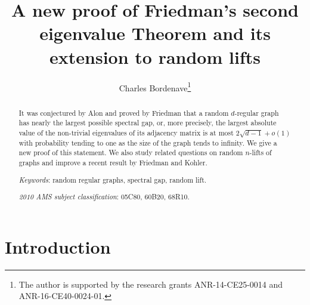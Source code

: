 \documentclass[11pt]{article}
\title{A new proof of Friedman's second eigenvalue Theorem and its extension to random lifts}
\author{Charles Bordenave\footnote{The author is supported by the research grants ANR-14-CE25-0014 and ANR-16-CE40-0024-01.}}
\newcommand{\1}{1\!\!{\sf I}}\newcommand{\IND}{\1}
\begin{document}
\maketitle



\begin{abstract}
It was conjectured by Alon and proved by Friedman that a random $d$-regular graph has nearly the largest possible spectral gap, or, more precisely, the largest absolute value of the non-trivial eigenvalues of its adjacency matrix is at most $2\sqrt{d-1} +o(1)$ with probability tending to one as the size of the graph tends to infinity. We give a new  proof of this statement.  We also study related questions on random $n$-lifts of graphs  and improve a recent result by Friedman and Kohler. 


{\em Keywords}: random regular graphs, spectral gap, random lift.

{\em 2010 AMS subject classification}:   	05C80, 60B20, 68R10.
\end{abstract}


\section{Introduction}
\end{document}
